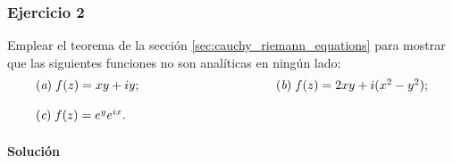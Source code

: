 \documentclass[a4paper]{report}
\begin{document}
\subsubsection{Ejercicio 2}

Emplear el teorema de la sección \ref{sec:cauchy_riemann_equations} para mostrar que las siguientes funciones no son analíticas en ningún lado:
\[
 \begin{array}{ll}
  (\textit{a})\;f(z)=xy+iy;\qquad\qquad\qquad\qquad\qquad&(\textit{b})\;f(z)=2xy+i(x^2-y^2);\\[\bigskipamount]
  (\textit{c})\;f(z)=e^{y}e^{ix}.
 \end{array}
\]

\paragraph{Solución} 
\end{document}
